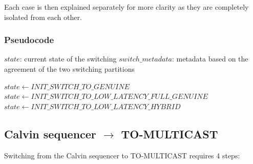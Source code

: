 \documentclass[a4paper, 10pt]{article}
\begin{document}
Each case is then explained separately for more clarity as they are completely isolated from each other.

\subsubsection{Pseudocode}

\begin{algorithmic}[1]
    \Variables
        \State $state$: current state of the switching
        \State $switch\_metadata$: metadata based on the agreement of the two switching partitions
    \EndVariables

         \label{alg:line:init_switch}
            \State $state \gets INIT\_SWITCH\_TO\_GENUINE$
        \Else
             \label{alg:line:init_switch_genuine}
                \State $state \gets INIT\_SWITCH\_TO\_LOW\_LATENCY\_FULL\_GENUINE$
            \Else
                \State $state \gets INIT\_SWITCH\_TO\_LOW\_LATENCY\_HYBRID$
            \EndIf \label{alg:line:init_switch_genuine:end}
        \EndIf \label{alg:line:init_switch:end}
    \EndUpon
\end{algorithmic}

\subsection{Calvin sequencer $\rightarrow$ TO-MULTICAST} \label{sec:calvin-to-genuine}

Switching from the Calvin sequencer to TO-MULTICAST requires 4 steps:
\end{document}
